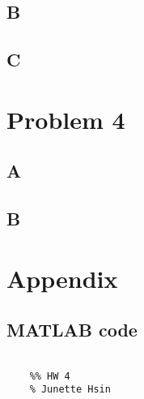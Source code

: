 \documentclass[conf]{new-aiaa}
\begin{document}
\subsection*{B}


\subsection*{C}




\section*{Problem 4}

\subsection*{A}



\subsection*{B}


\section*{Appendix} 

\subsection*{MATLAB code} 

\begin{lstlisting}

    %% HW 4 
    % Junette Hsin 
    

    
	
\end{lstlisting}






% 
\end{document}
